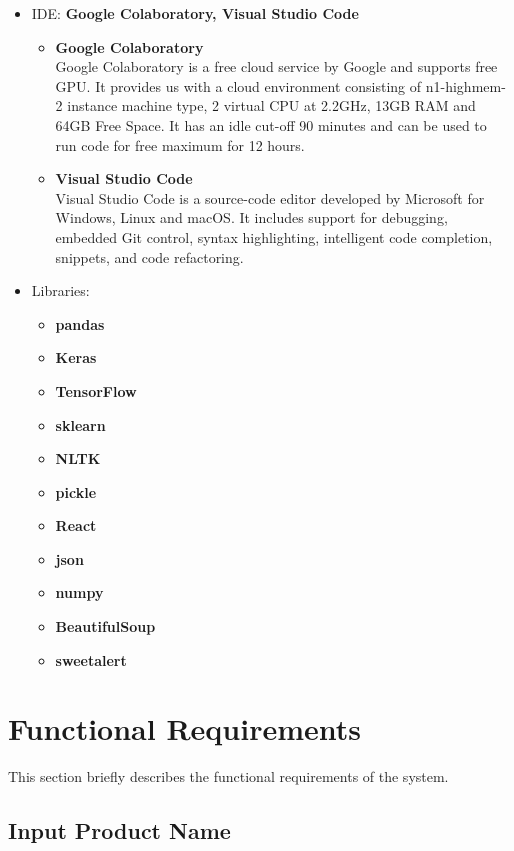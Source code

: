 \documentclass[11pt]{report}
\begin{document}
\begin{itemize}
\item IDE: \textbf{Google Colaboratory, Visual Studio Code}
\begin{itemize}
    \item \textbf{Google Colaboratory} \\
    Google Colaboratory is a free cloud service by Google and supports free GPU. It provides us with a cloud environment consisting of n1-highmem-2 instance machine type, 2 virtual CPU at 2.2GHz, 13GB RAM and  64GB Free Space. It has an idle cut-off 90 minutes and can be used to run code for free maximum for 12 hours. 
    \item \textbf{Visual Studio Code} \\
    Visual Studio Code is a source-code editor developed by Microsoft for Windows, Linux and macOS. It includes support for debugging, embedded Git control, syntax highlighting, intelligent code completion, snippets, and code refactoring. 
\end{itemize}

\item Libraries:
\begin{itemize}
    \item \textbf{pandas}
    \item \textbf{Keras}
    \item \textbf{TensorFlow}
    \item \textbf{sklearn}
    \item \textbf{NLTK}
    \item \textbf{pickle}
    \item \textbf{React}
    \item \textbf{json}
    \item \textbf{numpy}
    \item \textbf{BeautifulSoup}
    \item \textbf{sweetalert}
\end{itemize}
\end{itemize}

\newpage
\section{Functional Requirements}
This section briefly describes the functional requirements of the system.

\subsection{Input Product Name}
\end{document}
